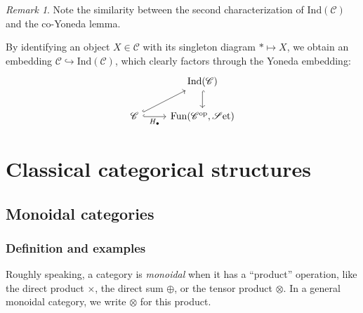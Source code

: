 \documentclass[10pt,oneside]{book}
\def\~#1{\mathscr{#1}}
\newcommand{\op}{\mathrm{op}}
\newcommand{\mono}{\hookrightarrow}
\newcommand{\Ind}{\mathrm{Ind}}
\newcommand{\Fun}{\mathrm{Fun}}
\newcommand{\Set}{\~S\mathrm{et}}
\theoremstyle{plain}
\theoremstyle{definition}
\theoremstyle{remark}
\newtheorem*{rmk}{Remark}
\numberwithin{equation}{section}
\numberwithin{figure}{section}
\begin{document}
\begin{rmk}
Note the similarity between the second characterization of $\Ind(\~C)$ and the co-Yoneda lemma.
\end{rmk}

By identifying an object $X \in \~C$ with its singleton diagram $\ast \mapsto X$, we obtain an embedding $\~C \mono \Ind(\~C)$, which clearly factors through the Yoneda embedding:
\[\begin{tikzcd}
    & {\Ind(\~C)} \\
    {\~C} & {\Fun(\~C^\op,\Set)}
    \arrow[hook, from=1-2, to=2-2]
    \arrow[hook, from=2-1, to=1-2]
    \arrow["{H_\bullet}"', hook, from=2-1, to=2-2]
\end{tikzcd}\]
\part{Classical categorical structures}

\chapter{Monoidal categories}

\section{Definition and examples}

Roughly speaking, a category is \emph{monoidal} when it has a ``product'' operation, like the direct product $\times$, the direct sum $\oplus$, or the tensor product $\otimes$. In a general monoidal category, we write $\otimes$ for this product. 
\end{document}
